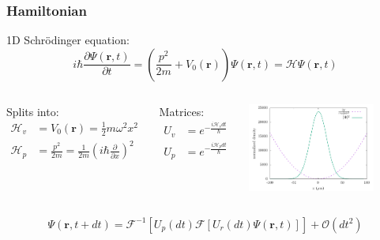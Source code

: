 \documentclass{beamer}
\begin{document}
\begin{frame}
\frametitle{Hamiltonian}
1D Schr\"odinger equation:
\begin{equation*}
i\hbar \frac{\partial \Psi(\mathbf{r}, t)}{\partial t} = \left(\frac{ p^2}{2m} + V_0(\mathbf{r}) \right)\Psi(\mathbf{r},t) = \mathcal{ H} \Psi(\mathbf{r},t)
\end{equation*}

\vspace{-0.25cm}
\begin{columns}
Splits into:
\begin{align*}
\mathcal{ H}_v &= V_0(\mathbf{r}) = \frac{1}{2}m\omega^2x^2\\
\mathcal{ H}_p &= \frac{p^2}{2m} = \frac{1}{2m}\left(i\hbar \frac{\partial}{\partial x}\right)^2
\end{align*}

\vspace{-0.1cm}
Matrices:
\begin{align*}
{U}_v &= e^{-\frac{i\mathcal{{H}}_vdt}{\hbar}} \\
{U}_p &= e^{-\frac{i\mathcal{{H}}_pdt}{\hbar}}
\end{align*}

\begin{center}
\includegraphics[width=0.8\textwidth]{SHO_2.pdf}
\end{center}

\end{columns}

\vspace{0.25cm}

\begin{equation*}
\Psi(\mathbf{r}, t+dt) = \mathcal{F}^{-1}\left[{U}_p(dt) \mathcal{F} \left[{U}_r(dt) \Psi(\mathbf{r},t) \right] \right] + \mathcal{O}(dt^2)
\end{equation*}

\end{frame}
\end{document}
